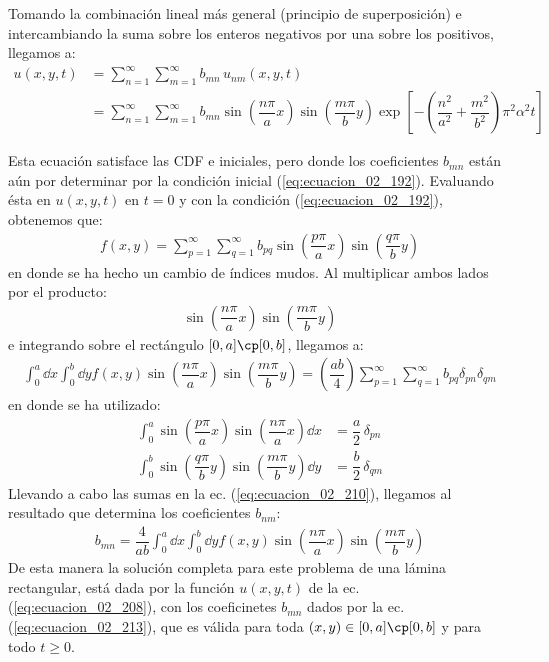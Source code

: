 Tomando la combinación lineal más general (principio de superposición) e intercambiando la suma sobre los enteros negativos por una sobre los positivos, llegamos a:
\begin{align}
u(x, y, t) &= \sum_{n=1}^{\infty} \sum_{m=1}^{\infty} b_{mn} \, u_{nm} (x, y, t) \label{eq:ecuacion_02_207} \\[0.5em]
&= \sum_{n=1}^{\infty} \sum_{m=1}^{\infty} b_{mn} \sin \left( \dfrac{n \pi}{a} x \right) \sin \left( \dfrac{m \pi}{b} y \right) \exp\left[ - \left( \dfrac{n^{2}}{a^{2}} {+} \dfrac{m^{2}}{b^{2}} \right) \pi^{2} \alpha^{2} t \right] \label{eq:ecuacion_02_208}
\end{align}

Esta ecuación satisface las CDF e iniciales, pero donde los coeficientes $b_{mn}$ están aún por determinar por la condición inicial (\ref{eq:ecuacion_02_192}). Evaluando ésta en $u(x, y, t)$ en $t = 0$ y con la condición (\ref{eq:ecuacion_02_192}), obtenemos que:
\begin{align}
f(x,y) = \sum_{p=1}^{\infty} \sum_{q=1}^{\infty} b_{pq} \sin \left( \dfrac{p \pi}{a} x \right) \sin \left( \dfrac{q \pi}{b} y \right) 
\end{align}
en donde se ha hecho un cambio de índices mudos. Al multiplicar ambos lados por el producto:
\begin{align*}
\sin \left( \dfrac{n \pi}{a} x \right) \sin \left( \dfrac{m \pi}{b} y \right) 
\end{align*}
e integrando sobre el rectángulo $[0, a] \cp [0, b]$, llegamos a:
\begin{align}
\int_{0}^{a} \dd{x} \int_{0}^{b} \dd{y} f(x, y) \sin \left( \dfrac{n \pi}{a} x \right) \sin \left( \dfrac{m \pi}{b} y \right) = \left( \dfrac{a b}{4} \right) \sum_{p=1}^{\infty} \sum_{q=1}^{\infty} b_{pq} \delta_{pn} \delta_{qm}
\label{eq:ecuacion_02_210}
\end{align}
en donde se ha utilizado:
\begin{align}
\int_{0}^{a} \sin \left( \dfrac{p \pi}{a} x \right) \sin \left( \dfrac{n \pi}{a} x \right) \dd{x} &= \dfrac{a}{2} \, \delta_{pn} \label{eq:ecuacion_02_211} \\[0.5em]
\int_{0}^{b} \sin \left( \dfrac{q \pi}{b} y \right) \sin \left( \dfrac{m \pi}{b} y \right) \dd{y} &= \dfrac{b}{2} \, \delta_{qm} \label{eq:ecuacion_02_212}
\end{align}
Llevando a cabo las sumas en la ec. (\ref{eq:ecuacion_02_210}), llegamos al resultado que determina los coeficientes $b_{nm}$:
\begin{align}
b_{mn} = \dfrac{4}{ab} \int_{0}^{a} \dd{x} \int_{0}^{b} \dd{y} f(x, y) \sin \left( \dfrac{n \pi}{a} x \right) \sin \left( \dfrac{m \pi}{b} y \right)
\label{eq:ecuacion_02_213}
\end{align}
De esta manera la solución completa para este problema de una lámina rectangular, está dada por la función $u(x, y, t)$ de la ec. (\ref{eq:ecuacion_02_208}), con los coeficinetes $b_{mn}$ dados por la ec. (\ref{eq:ecuacion_02_213}), que es válida para toda $(x, y) \in [0, a] \cp [0, b]$ y para todo $t \geq 0$. 


